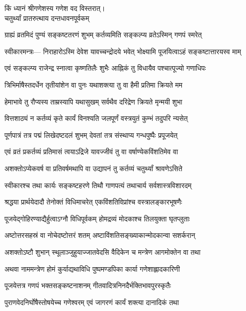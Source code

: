 किं ध्यानं श्रीगणेशस्य गणेश वद विस्तरात्।\\
\onelineshloka
{चतुर्थ्यां प्रातरुत्थाय दन्तधावनपूर्वकम्} %


\twolineshloka
{ग्राह्यं व्रतमिदं पुण्यं सङ्कष्टतरणं शुभम्}
{कर्तव्यमिति सङ्कल्प्य व्रतेऽस्मिन् गणपं स्मरेत्} %


स्वीकारमन्त्रः— 
\twolineshloka
{निराहारोऽस्मि देवेश यावच्चन्द्रोदये भवेत्}
{भोक्ष्यामि पूजयित्वाऽहं सङ्कष्टात्तारयस्व माम्} %


\twolineshloka
{एवं सङ्कल्प्य राजेन्द्र स्नात्वा कृष्णतिलैः शुभैः}
{आह्निकं तु विधायैव पश्चात्पूज्यो गणाधिपः} %


\twolineshloka
{त्रिभिर्माषैस्तदर्धेन तृतीयांशेन वा पुनः}
{यथाशक्त्या तु वा हैमी प्रतिमा क्रियते मम} %


\twolineshloka
{हेमाभावे तु रौप्यस्य ताम्रस्यापि यथासुखम्}
{सर्वथैव दरिद्रेण क्रियते मृन्मयी शुभा} %


\twolineshloka
{वित्तशाठ्यं न कर्तव्यं कृते कार्यं विनश्यति}
{जलपूर्णं वस्त्रयुतं कुम्भं तदुपरि न्यसेत्} %


\twolineshloka
{पूर्णपात्रं तत्र पद्मं लिखेदष्टदलं शुभम्}
{देवतां तत्र संस्थाप्य गन्धपुष्पैः प्रपूजयेत्} %


\twolineshloka
{एवं व्रतं प्रकर्तव्यं प्रतिमासं त्वयाऽद्रिजे}
{यावज्जीवं तु वा वर्षाण्येकविंशतिमेव वा} %


\twolineshloka
{अशक्तोऽप्येकवर्ष वा प्रतिवर्षमथापि वा}
{उद्यापनं तु कर्तव्यं चतुर्थ्यां श्रावणेऽसिते} %


\twolineshloka
{स्वीकारश्च तथा कार्यः सङ्कष्टहरणे तिथौ}
{गाणपत्यं तथाचार्य सर्वशास्त्रविशारदम्} %


\twolineshloka
{श्रद्धया प्रार्थयेदादौ तेनोक्तं विधिमाचरेत्}
{एकविंशतिविप्रांश्च वस्त्रालङ्कारभूषणैः} %


\twolineshloka
{पूजयेद्गोहिरण्याद्यैर्हुत्वाऽग्नौ विधिपूर्वकम्}
{होमद्रव्यं मोदकाश्च तिलयुक्ता घृतप्लुताः} %


\twolineshloka
{अष्टोत्तरसहस्रं वा नोचेदष्टोत्तरं शतम्}
{अष्टाविंशतिसङ्ख्याकान्मोदकान्वा सशर्करान्} %


\twolineshloka
{अशक्तोऽष्टौ शुभान् स्थूलाञ्जुहुयाज्जातवेदसि}
{वैदिकेन च मन्त्रेण आगमोक्तेन वा तथा} %


\twolineshloka
{अथवा नाममन्त्रेण होमं कुर्याद्यथाविधि}
{पुष्पमण्डपिका कार्या गणेशाह्लादकारिणी} %


\twolineshloka
{पूजयेत्तत्र गणपं भक्तसङ्कष्टनाशनम्}
{गीतवादित्रनिनदैर्भक्तिभावपुरस्कृतैः} %


\twolineshloka
{पुराणवेदनिर्घोषैस्तोषयेच्च गणेश्वरम्}
{एवं जागरणं कार्यं शक्त्या दानादिकं तथा} %


